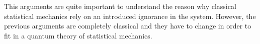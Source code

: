 \indent This arguments are quite important to understand the reason why classical statistical mechanics rely on an introduced ignorance in the system. However, the previous arguments are completely classical and they have to change in order to fit in a quantum theory of statistical mechanics.







